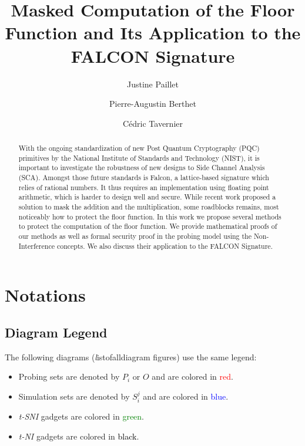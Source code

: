 \documentclass[runningheads]{llncs}
\begin{document}
%
\title{Masked Computation of the Floor Function and Its Application to the FALCON Signature}
%
%
\author{Justine Paillet \and
  Pierre-Augustin Berthet \and
C\'edric Tavernier}
%
%
%
\maketitle              %
%
\begin{abstract}
With the ongoing standardization of new Post Quantum Cryptography (PQC) primitives by the National Institute of Standards and Technology (NIST), it is important to investigate the robustness of new designs to Side Channel Analysis (SCA). Amongst those future standards is Falcon, a lattice-based signature which relies of rational numbers. It thus requires an implementation using floating point arithmetic, which is harder to design well and secure. While recent work proposed a solution to mask the addition and the multiplication, some roadblocks remains, most noticeably how to protect the floor function. In this work we propose several methods to protect the computation of the floor function. We provide mathematical proofs of our methods as well as formal security proof in the probing model using the Non-Interference concepts. We also discuss their application to the FALCON Signature.

\end{abstract}
%
%
%
\section{Notations}
\subsection{Diagram Legend}
\cite{10.1007/3-540-68697-5_9}
The following diagrams (\emph listofalldiagram figures) use the same legend:\begin{itemize}
    \item Probing sets are denoted by $P_i$ or $O$ and are colored in \textcolor{red}{red}.
    \item Simulation sets are denoted by $S_i^j$ and are colored in \textcolor{blue}{blue}.
    \item \emph{t-SNI} gadgets are colored in \textcolor{green}{green}.
    \item \emph{t-NI} gadgets are colored in \textcolor{black}{black}.
\end{itemize}
\end{document}
